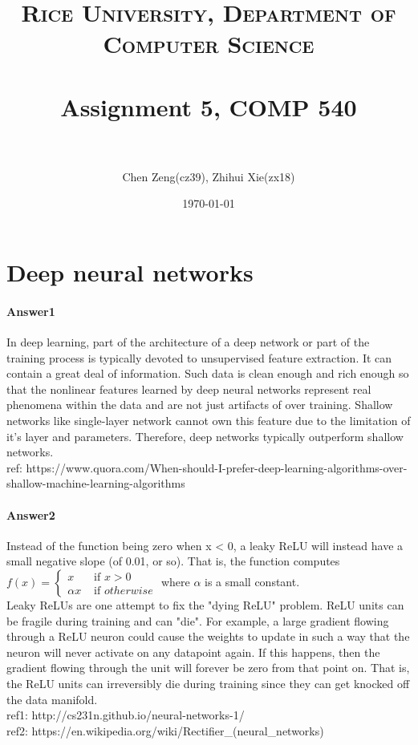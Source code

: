 \documentclass[paper=a4, fontsize=11pt]{scrartcl} %
\title{	
\normalfont \normalsize
\textsc{Rice University, Department of Computer Science} \\ [25pt] %
\horrule{0.5pt} \\[0.4cm] %
\huge Assignment 5, COMP 540 \\ %
\horrule{2pt} \\[0.5cm] %
}
\author{Chen Zeng(cz39), Zhihui Xie(zx18)} %
\date{\normalsize\today} %
\numberwithin{equation}{section} %
\numberwithin{figure}{section} %
\numberwithin{table}{section} %
\begin{document}
\maketitle %

\section{Deep neural networks}
\paragraph{\textbf{Answer1}}
In deep learning, part of the architecture of a deep network or part of the training process is typically devoted to unsupervised feature extraction. It can contain a great deal of information. Such data is clean enough and rich enough so that the nonlinear features learned by deep neural networks represent real phenomena within the data and are not just artifacts of over training. Shallow networks like single-layer network cannot own this feature due to the limitation of it's layer and parameters. Therefore, deep networks typically outperform shallow networks.
\\ ref: https://www.quora.com/When-should-I-prefer-deep-learning-algorithms-over-shallow-machine-learning-algorithms

\paragraph{\textbf{Answer2}}
Instead of the function being zero when x < 0, a leaky ReLU will instead have a small negative slope (of 0.01, or so). That is, the function computes $f\left ( x \right )=\begin{cases}
 x& \text{ if } x> 0 \\ 
 \alpha x& \text{ if } otherwise 
\end{cases}$ where $\alpha$ is a small constant.
\\ Leaky ReLUs are one attempt to fix the "dying ReLU" problem. ReLU units can be fragile during training and can "die". For example, a large gradient flowing through a ReLU neuron could cause the weights to update in such a way that the neuron will never activate on any datapoint again. If this happens, then the gradient flowing through the unit will forever be zero from that point on. That is, the ReLU units can irreversibly die during training since they can get knocked off the data manifold. 
\\ ref1: http://cs231n.github.io/neural-networks-1/
\\ ref2: https://en.wikipedia.org/wiki/Rectifier\_(neural\_networks)
\end{document}
